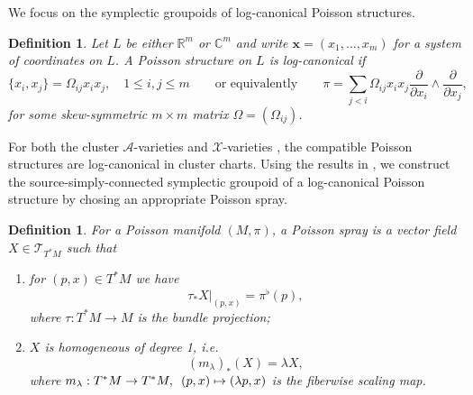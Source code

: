 \documentclass{amsart}
\newtheorem{definition}[theorem]{Definition}
\newtheorem{remark}[theorem]{Remark}
\numberwithin{equation}{section}
\newcommand{\bfx}{{\boldsymbol{x}}}
\newcommand{\cA}{\mathcal{A}}
\newcommand{\cT}{\mathcal{T}}
\newcommand{\cX}{\mathcal{X}}
\newcommand{\CC}{\mathbb{C}}
\newcommand{\RR}{\mathbb{R}}
\begin{document}

We focus on the symplectic groupoids of log-canonical Poisson structures.
\begin{definition} 
  \label{def: logPoisson}
  Let $L$ be either $\RR^m$ or $\CC^m$ and write $\bfx = (x_1, \ldots, x_m)$ for a system of coordinates on $L$.
  A Poisson structure on $L$ is \emph{log-canonical} if
  $$
    \{x_i, x_j\} = \Omega_{ij} x_ix_j, \quad 1 \leq i,j \leq m \qquad \text{or equivalently} \qquad
    \pi = \sum_{j < i} \Omega_{ij} x_ix_j\frac{\partial}{\partial x_i} \wedge \frac{\partial}{\partial x_j},
  $$
  for some skew-symmetric $m\times m$ matrix $\Omega = (\Omega_{ij})$.
\end{definition}

For both the cluster $\cA$-varieties \cite{GSV10} and $\cX$-varieties \cite{FG09c}, the compatible Poisson structures are log-canonical in cluster charts.
Using the results in \cite{MR2900786, CMS17}, we construct the source-simply-connected symplectic groupoid of a log-canonical Poisson structure by chosing an appropriate Poisson spray. 
\begin{definition} 
  \cite{MR2900786}
  For a Poisson manifold $(M, \pi)$, a \emph{Poisson spray} is a vector field $X \in \cT_{T^*M}$ such that
  \begin{enumerate}
    \item for $(p,x) \in T^*M$ we have
      \[\tau_* X|_{(p,x)} = \pi^\flat(p),\]
      where $\tau: T^*M \to M$ is the bundle projection;
    \item $X$ is homogeneous of degree 1, i.e.
      \[(m_\lambda)_*(X) = \lambda X,\]
      where $m_\lambda: T^*M \to T^*M, \enskip (p,x) \mapsto (\lambda p,x)$ is the fiberwise scaling map.
  \end{enumerate}
\end{definition}
\end{document}
